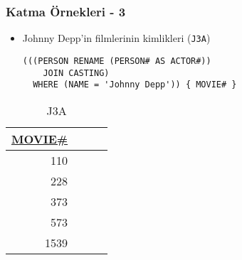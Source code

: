 \documentclass[dvipsnames]{beamer}
\theoremstyle{plain}
\begin{document}
\begin{frame}[fragile]
  \frametitle{Katma Örnekleri - 3}

    \begin{itemize}
      \item Johnny Depp'in filmlerinin kimlikleri (\texttt{J3A})


    \begin{lstlisting}
(((PERSON RENAME (PERSON# AS ACTOR#))
    JOIN CASTING)
  WHERE (NAME = 'Johnny Depp')) { MOVIE# }
  \end{lstlisting}
   \end{itemize}

    \vspace{-10pt}
    \begin{tiny}
    \begin{table}
      \caption{J3A}
      \begin{tabular}{|r|l|r|r|}\hline
\underline{MOVIE\#}\\[2pt]\hline\hline
                110\\\hline
                228\\\hline
                373\\\hline
                573\\\hline
               1539\\\hline
      \end{tabular}
    \end{table}
    \end{tiny}
\end{frame}
\end{document}
